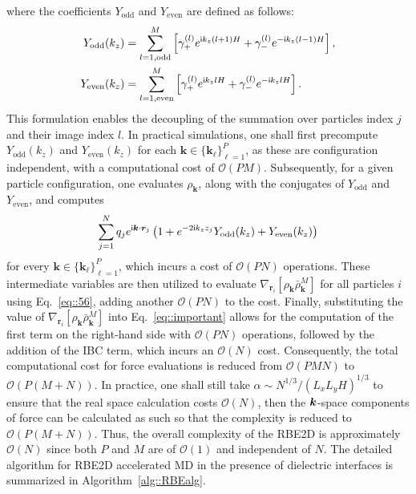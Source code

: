  {where the coefficients $Y_{\text{odd}}$ and $Y_{\text{even}}$ are defined as follows: 
\begin{equation}
    \begin{split}
        Y_{\text{odd}}(k_z) &= \sum_{\substack{l=1, \text{odd}}}^{M}\left[\gamma_{+}^{(l)}e^{\mathsf i k_z(l+1) H}+\gamma_{-}^{(l)}e^{-\mathsf i k_z (l-1)H}\right], \\ 
        Y_{\text{even}}(k_z) &= \sum_{\substack{l=1, \text{even}}}^{M}\left[\gamma_{+}^{(l)}e^{\mathsf i k_zl H}+\gamma_{-}^{(l)}e^{-\mathsf i k_z l H}\right].
    \end{split}
\end{equation}
This formulation enables the decoupling of the summation over particles index $j$ and their image index $l$. 
In practical simulations, one shall first precompute $Y_{\text{odd}}(k_z)$ and $Y_{\text{even}}(k_z)$ for each $\bm{k} \in \{\bm{k}_{\ell}\}_{\ell=1}^{P}$, as these are configuration independent, with a computational cost of $\mathcal{O}(PM)$. 
Subsequently, for a given particle configuration, one evaluates $\rho_{\bm{k}}$, along with the conjugates of $Y_{\text{odd}}$ and $Y_{\text{even}}$, and computes
\begin{equation}
    \sum_{j=1}^{N}q_je^{\mathsf i\bm{k}\cdot\bm{r}_{j}}\left(1+e^{-2\mathsf i k_zz_j}Y_{\text{odd}}(k_z)+Y_{\text{even}}(k_z)\right)
\end{equation}
for every $\bm{k}\in\{\bm{k}_{\ell}\}_{\ell=1}^{P}$, which incurs a cost of $\mathcal{O}(PN)$ operations. These intermediate variables are then utilized to evaluate $\nabla_{\bm{r}_i}\left[\rho_{\bm{k}}\bar{\rho}_{\bm{k}}^{M}\right]$ for all particles $i$ using Eq.~\eqref{eq::56}, adding another $\mathcal O(PN)$ to the cost. Finally, substituting the value of $\nabla_{\bm{r}_i}\left[\rho_{\bm{k}}\bar{\rho}_{\bm{k}}^{M}\right]$ into Eq.~\eqref{eq::important} allows for the computation of the first term on the right-hand side with $\mathcal{O}(PN)$ operations, followed by the addition of the IBC term, which incurs an $\mathcal{O}(N)$ cost. Consequently, the total computational cost for force evaluations is reduced from $\mathcal O(PMN)$ to $\mathcal O(P(M+N))$.
In practice, one shall still take $\alpha \sim N^{1/3}/(L_xL_yH)^{1/3}$ to ensure that the real space calculation costs $\mathcal{O}(N)$, then the $\boldsymbol{k}$-space components of force can be calculated as such so that the complexity is reduced to $\mathcal{O}(P(M+N))$.}
Thus, the overall complexity of the RBE2D is approximately $\mathcal{O}(N)$ since both $P$ and $M$ are of $\mathcal O(1)$ and independent   {of} $N$.
The detailed algorithm for RBE2D accelerated MD in the presence of dielectric interfaces is summarized in Algorithm~\ref{alg::RBEalg}.

